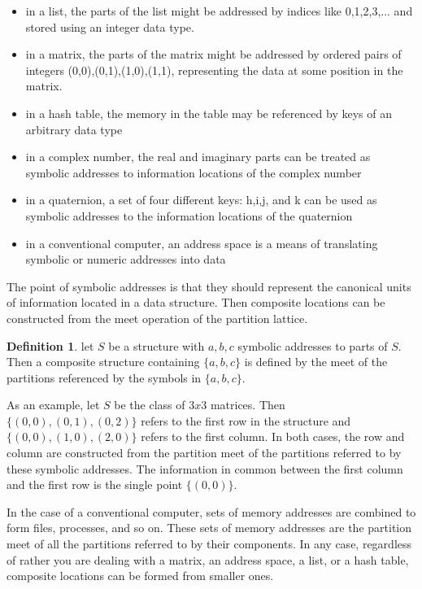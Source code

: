 \documentclass[a4paper,11pt, notitlepage]{report}
\theoremstyle{definition}
\newtheorem{definition}{Definition}[section]
\begin{document}
\begin{itemize}
 \item in a list, the parts of the list might be addressed by indices like 0,1,2,3,... and stored using an integer data type.
 \item in a matrix, the parts of the matrix might be addressed by ordered pairs of integers (0,0),(0,1),(1,0),(1,1), representing the data at some position in the matrix.
 \item in a hash table, the memory in the table may be referenced by keys of an arbitrary data type
 \item in a complex number, the real and imaginary parts can be treated as symbolic addresses to information locations of the complex number
 \item in a quaternion, a set of four different keys: h,i,j, and k can be used as symbolic addresses to the information locations of the quaternion
 \item in a conventional computer, an address space is a means of translating symbolic or numeric addresses into data
\end{itemize}

The point of symbolic addresses is that they should represent the canonical units of information located in a data structure. Then composite locations can be constructed from the meet operation of the partition lattice.

\begin{definition}
let $S$ be a structure with $a,b,c$ symbolic addresses to parts of $S$. Then a composite structure containing $\{a,b,c\}$ is defined by the meet of the partitions referenced by the symbols in $\{a,b,c\}$.
\end{definition}

As an example, let $S$ be the class of $3x3$ matrices. Then $\{(0,0),(0,1),(0,2)\}$ refers to the first row in the structure and $\{(0,0),(1,0),(2,0)\}$ refers to the first column. In both cases, the row and column are constructed from the partition meet of the partitions referred to by these symbolic addresses. The information in common between the first column and the first row is the single point $\{(0,0)\}$.

In the case of a conventional computer, sets of memory addresses are combined to form files, processes, and so on. These sets of memory addresses are the partition meet of all the partitions referred to by their components. In any case, regardless of rather you are dealing with a matrix, an address space, a list, or a hash table, composite locations can be formed from smaller ones.
\end{document}
